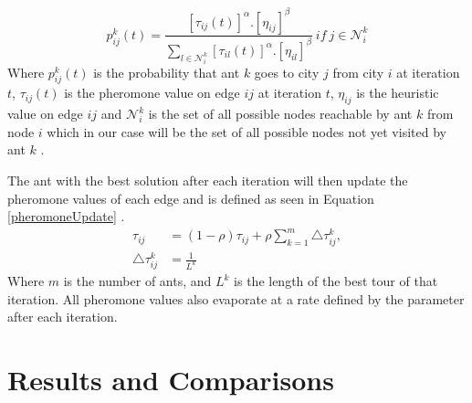 \documentclass[11pt,a4paper,final]{article}
\begin{document}
	\begin{equation}
	\label{ACOProb}
	p^k_{ij}(t)=\frac{[\tau_{ij}(t)]^{\alpha}.[\eta_{ij}]^{\beta}}{\sum_{l\in\mathcal{N}^k_i}[\tau_{il}(t)]^{\alpha}.[\eta_{il}]^{\beta}}\ if\ j\in\mathcal{N}^k_i
	\end{equation}
	Where $p^k_{ij}(t)$ is the probability that ant $k$ goes to city $j$ from city $i$ at iteration $t$, $\tau_{ij}(t)$ is the pheromone value on edge $ij$ at iteration $t$, $\eta_{ij}$ is the heuristic value on edge $ij$ and $\mathcal{N}^k_i$ is the set of all possible nodes reachable by ant $k$ from node $i$ which in our case will be the set of all possible nodes not yet visited by ant $k$ \cite{GargACO}.\\
	
	\par The ant with the best solution after each iteration will then update the pheromone values of each edge and is defined as seen in Equation \ref{pheromoneUpdate} \cite{fastACO}.
	\begin{equation}
	\label{pheromoneUpdate}
	\begin{split}
	\tau_{ij} &= (1-\rho)\tau_{ij}+\rho\sum_{k=1}^{m}\triangle\tau_{ij}^{k},\\
	\triangle\tau_{ij}^{k} &=\frac{1}{L^k}
	\end{split}	
	\end{equation}
	Where $m$ is the number of ants, and $L^k$ is the length of the best tour of that iteration. All pheromone values also evaporate at a rate defined by the parameter after each iteration.
	\section{Results and Comparisons}
	\label{Results}
\end{document}

